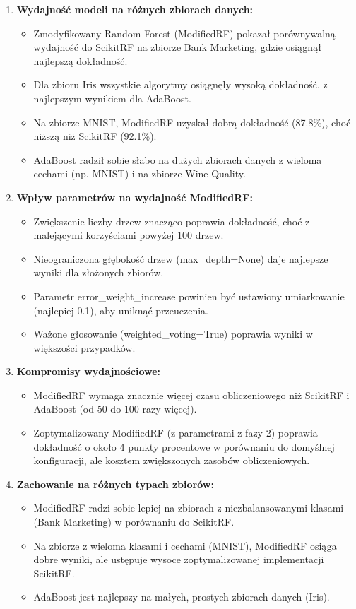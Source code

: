 \documentclass[11pt,a4paper]{article}
\begin{document}
\begin{enumerate}
    \item \textbf{Wydajność modeli na różnych zbiorach danych:}
    \begin{itemize}
        \item Zmodyfikowany Random Forest (ModifiedRF) pokazał porównywalną wydajność do ScikitRF na zbiorze Bank Marketing, gdzie osiągnął najlepszą dokładność.
        \item Dla zbioru Iris wszystkie algorytmy osiągnęły wysoką dokładność, z najlepszym wynikiem dla AdaBoost.
        \item Na zbiorze MNIST, ModifiedRF uzyskał dobrą dokładność (87.8\%), choć niższą niż ScikitRF (92.1\%).
        \item AdaBoost radził sobie słabo na dużych zbiorach danych z wieloma cechami (np. MNIST) i na zbiorze Wine Quality.
    \end{itemize}

    \item \textbf{Wpływ parametrów na wydajność ModifiedRF:}
    \begin{itemize}
        \item Zwiększenie liczby drzew znacząco poprawia dokładność, choć z malejącymi korzyściami powyżej 100 drzew.
        \item Nieograniczona głębokość drzew (max\_depth=None) daje najlepsze wyniki dla złożonych zbiorów.
        \item Parametr error\_weight\_increase powinien być ustawiony umiarkowanie (najlepiej 0.1), aby uniknąć przeuczenia.
        \item Ważone głosowanie (weighted\_voting=True) poprawia wyniki w większości przypadków.
    \end{itemize}

    \item \textbf{Kompromisy wydajnościowe:}
    \begin{itemize}
        \item ModifiedRF wymaga znacznie więcej czasu obliczeniowego niż ScikitRF i AdaBoost (od 50 do 100 razy więcej).
        \item Zoptymalizowany ModifiedRF (z parametrami z fazy 2) poprawia dokładność o około 4 punkty procentowe w porównaniu do domyślnej konfiguracji, ale kosztem zwiększonych zasobów obliczeniowych.
    \end{itemize}

    \item \textbf{Zachowanie na różnych typach zbiorów:}
    \begin{itemize}
        \item ModifiedRF radzi sobie lepiej na zbiorach z niezbalansowanymi klasami (Bank Marketing) w porównaniu do ScikitRF.
        \item Na zbiorze z wieloma klasami i cechami (MNIST), ModifiedRF osiąga dobre wyniki, ale ustępuje wysoce zoptymalizowanej implementacji ScikitRF.
        \item AdaBoost jest najlepszy na małych, prostych zbiorach danych (Iris).
    \end{itemize}
\end{enumerate}
\end{document}
